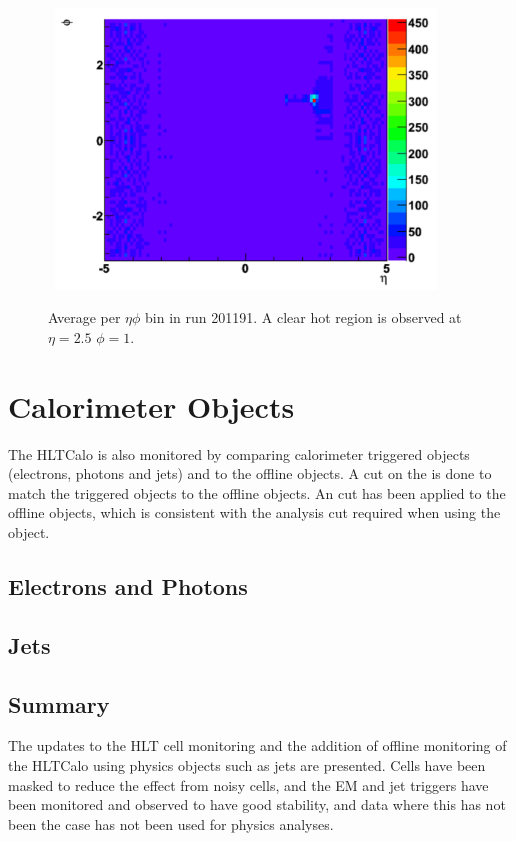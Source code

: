 \begin{figure}
\centering
\mbox{
   \includegraphics[width=0.9\textwidth]{figures/ServiceWork/Cells_HotSpot.pdf}
}
\caption[Offline egamma \et{} verses L2/EF egamma \et{}]{Average \et{} per $\eta \phi$ bin in run 201191. A clear hot region is observed at $\eta=2.5$ $\phi=1$. \label{SW_hotspot}}
\end{figure}



\section{Calorimeter Objects}

The HLTCalo is also monitored by comparing calorimeter triggered objects (electrons, photons and jets) and to the offline objects.
A cut on the \dr{} is done to match the triggered objects to the offline objects.
An \et{} cut has been applied to the offline objects, which is consistent with the analysis cut required when using the object. 



\subsection{Electrons and Photons}




 
\subsection{Jets}
\label{HLTCalo:Jets}




\subsection{Summary}

The updates to the HLT cell monitoring and the addition of offline monitoring of the HLTCalo using physics objects such as jets are presented.
Cells have been masked to reduce the effect from noisy cells, and the EM and jet triggers have been monitored and observed to have good stability, and data where this has not been the case has not been used for physics analyses.
